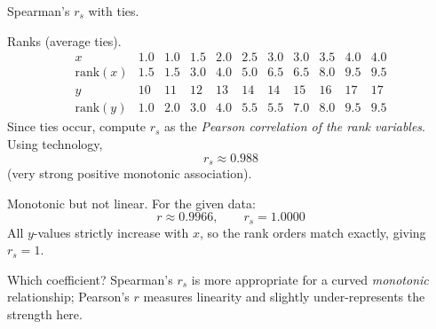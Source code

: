 \documentclass[11pt]{article}
\def\textbf#1{#1}%
\def\textit#1{#1}%
\begin{document}
\begin{solution}
\textbf{Spearman’s $r_s$ with ties.}

\textit{Ranks (average ties).}
\[
\begin{array}{c|cccccccccc}
x & 1.0 & 1.0 & 1.5 & 2.0 & 2.5 & 3.0 & 3.0 & 3.5 & 4.0 & 4.0\\
\text{rank}(x) & 1.5 & 1.5 & 3.0 & 4.0 & 5.0 & 6.5 & 6.5 & 8.0 & 9.5 & 9.5\\
\hline
y & 10 & 11 & 12 & 13 & 14 & 14 & 15 & 16 & 17 & 17\\
\text{rank}(y) & 1.0 & 2.0 & 3.0 & 4.0 & 5.5 & 5.5 & 7.0 & 8.0 & 9.5 & 9.5
\end{array}
\]
Since ties occur, compute $r_s$ as the \emph{Pearson correlation of the rank variables}.
Using technology,
\[
\boxed{\,r_s \approx 0.988\,}
\]
(very strong positive monotonic association).

\begin{center}
\end{center}
\end{solution}

\begin{solution}
\textbf{Monotonic but not linear.}
For the given data:
\[
\boxed{\,r \approx 0.9966,\qquad r_s = 1.0000\,}
\]
All $y$-values strictly increase with $x$, so the rank orders match exactly, giving $r_s=1$.
\medskip

\textit{Which coefficient?} Spearman’s $r_s$ is more appropriate for a curved \emph{monotonic} relationship; Pearson’s $r$
measures linearity and slightly under-represents the strength here.
\end{solution}
\end{document}
